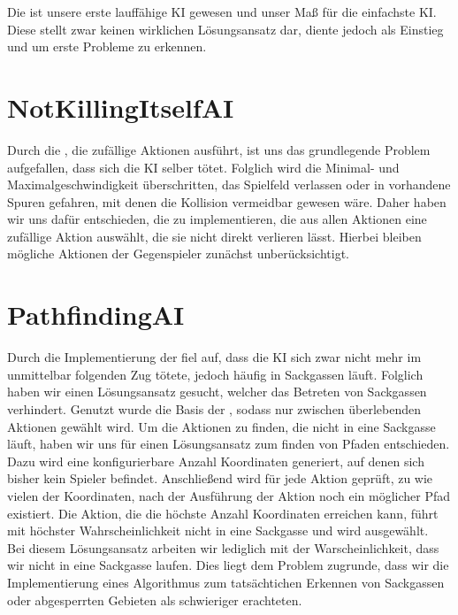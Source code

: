 Die  ist unsere erste lauffähige KI gewesen und unser Maß für die einfachste \acs{KI}.
Diese stellt zwar keinen wirklichen Lösungsansatz dar, diente jedoch als Einstieg und um erste Probleme zu erkennen.


\section{NotKillingItselfAI}
\label{sec:notkillingitself-ai}

Durch die , die zufällige Aktionen ausführt, ist uns das grundlegende Problem aufgefallen, dass sich die
\acs{KI} selber tötet.
Folglich wird die Minimal- und Maximalgeschwindigkeit überschritten, das Spielfeld verlassen oder in vorhandene Spuren
gefahren, mit denen die Kollision vermeidbar gewesen wäre.
Daher haben wir uns dafür entschieden, die  zu implementieren, die aus allen
Aktionen eine zufällige Aktion auswählt, die sie nicht direkt verlieren lässt.
Hierbei bleiben mögliche Aktionen der Gegenspieler zunächst unberücksichtigt.\\


\section{PathfindingAI}
\label{sec:pathfinding-ai}

Durch die Implementierung der  fiel auf, dass die \acs{KI} sich zwar nicht mehr im unmittelbar
folgenden Zug tötete, jedoch häufig in Sackgassen läuft.
Folglich haben wir einen Lösungsansatz gesucht, welcher das Betreten von Sackgassen verhindert.
Genutzt wurde die Basis der , sodass nur zwischen überlebenden Aktionen gewählt wird.
Um die Aktionen zu finden, die nicht in eine Sackgasse läuft, haben wir uns für einen Lösungsansatz zum finden von
Pfaden entschieden.
Dazu wird eine konfigurierbare Anzahl Koordinaten generiert, auf denen sich bisher kein Spieler befindet.
Anschließend wird für jede Aktion geprüft, zu wie vielen der Koordinaten, nach der Ausführung der Aktion noch ein
möglicher Pfad existiert. 
Die Aktion, die die höchste Anzahl Koordinaten erreichen kann, führt mit höchster Wahrscheinlichkeit
nicht in eine Sackgasse und wird ausgewählt. \\

Bei diesem Lösungsansatz arbeiten wir lediglich mit der Warscheinlichkeit, dass wir nicht in eine Sackgasse laufen.
Dies liegt dem Problem zugrunde, dass wir die Implementierung eines Algorithmus zum tatsächtichen Erkennen von
Sackgassen oder abgesperrten Gebieten als schwieriger erachteten.


